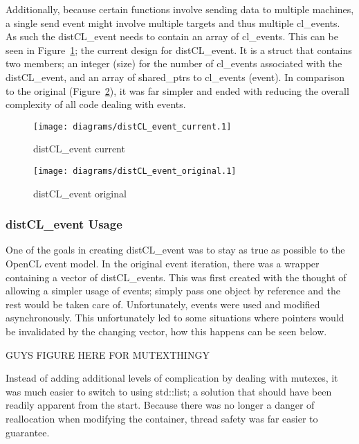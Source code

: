\documentclass[report.tex]{subfiles}
\begin{document}
        Additionally, because certain functions involve sending data to multiple machines, a single send event might involve multiple targets and thus multiple cl\_events. As such the distCL\_event needs to contain an array of cl\_events. This can be seen in Figure~\ref{fig:distCL_event_uml_current}; the current design for distCL\_event. It is a struct that contains two members; an integer (size) for the number of cl\_events associated with the distCL\_event, and an array of shared\_ptrs to cl\_events (event). In comparison to the original (Figure~\ref{fig:distCL_event_uml_original}), it was far simpler and ended with reducing the overall complexity of all code dealing with events.

        \begin{figure}[htbp]
            \centering
            \texttt{[image: diagrams/distCL\_event\_current.1]}
            \caption{distCL\_event current}
            \label{fig:distCL_event_uml_current}
        \end{figure}

        \begin{figure}[htbp]
            \centering
            \texttt{[image: diagrams/distCL\_event\_original.1]}
            \caption{distCL\_event original}
            \label{fig:distCL_event_uml_original}
        \end{figure}
        

    \subsubsection{distCL\_event Usage} %
    \label{ssub:distcl_event_usage}
        One of the goals in creating distCL\_event was to stay as true as possible to the OpenCL event model. In the original event iteration, there was a wrapper containing a vector of distCL\_events. This was first created with the thought of allowing a simpler usage of events; simply pass one object by reference and the rest would be taken care of. Unfortunately, events were used and modified asynchronously. This unfortunately led to some situations where pointers would be invalidated by the changing vector, how this happens can be seen below.

        GUYS FIGURE HERE FOR MUTEXTHINGY

        Instead of adding additional levels of complication by dealing with mutexes, it was much easier to switch to using std::list; a solution that should have been readily apparent from the start. Because there was no longer a danger of reallocation when modifying the container, thread safety was far easier to guarantee.
        
\end{document}

